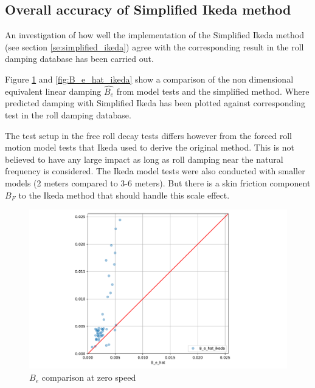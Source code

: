 \subsection{Overall accuracy of Simplified Ikeda method}
\label{se:overall_comparison}
An investigation of how well the implementation of the Simplified Ikeda method (see section \ref{se:simplified_ikeda}) agree with the corresponding result in the roll damping database has been carried out.

Figure \ref{fig:B_e_hat_ikeda_zero} and \ref{fig:B_e_hat_ikeda} show a comparison of the non dimensional equivalent linear damping $\hat{B_e}$
from model tests and the simplified method. Where predicted damping with Simplified Ikeda has been plotted against corresponding test in the roll damping database.  

The test setup in the free roll decay tests differs however from the forced roll motion model tests that Ikeda \cite{ikeda_velocity_1979} used to derive the original method. This is not believed to have any large impact as long as roll damping near the natural frequency is considered. The Ikeda model tests were also conducted with smaller models (2 meters compared to 3-6 meters). But there is a skin friction component $B_F$ to the Ikeda method that should handle this scale effect.

\begin{figure}[H]
    \centering
    \includegraphics[width=0.9\columnwidth]{figures/B_e_hat_ikeda_zero.pdf}
    \caption{$\hat{B_e}$ comparison at zero speed}
    \label{fig:B_e_hat_ikeda_zero}
\end{figure}

